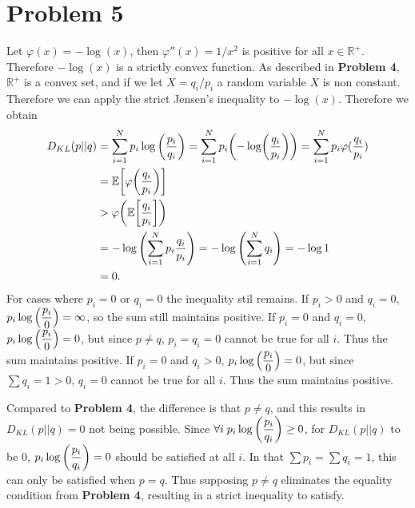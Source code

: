 \documentclass[10pt]{article}
\begin{document}
\section*{Problem 5}
Let $\varphi(x) = -\log(x)$, then $\varphi''(x) = 1/x^2$ is positive for all $x \in \mathbb{R}^+$. Therefore $-\log(x)$ is a strictly convex function.
As described in \textbf{Problem 4}, $\mathbb{R}^+$ is a convex set, and if we let $X = {q_i}/{p_i}$ a random variable $X$ is non constant.
Therefore we can apply the strict Jensen's inequality to $-\log(x)$. 
Therefore we obtain
\begin{align*}
    D_{KL}(p||q) &= \sum_{i=1}^{N}p_i\log\qty(\frac{p_i}{q_i}) = \sum_{i=1}^{N}p_i\qty(-\log(\frac{q_i}{p_i})) = \sum_{i=1}^{N}p_i\varphi(\frac{q_i}{p_i})\\
    &= \mathbb{E}\qty[\varphi\qty(\frac{q_i}{p_i})] \\
    &> \varphi\qty(\mathbb{E}\qty[\frac{q_i}{p_i}]) \\
    &= -\log\qty(\sum_{i=1}^{N}p_i\frac{q_i}{p_i}) = -\log\qty(\sum_{i=1}^{N}q_i) = -\log 1 \\
    &= 0.
\end{align*}
For cases where $p_i = 0$ or $q_i = 0$ the inequality stil remains. If $p_i > 0$ and $q_i = 0$, $p_i\log\qty(\dfrac{p_i}{0}) = \infty$, so the sum still maintains positive.
If $p_i = 0$ and $q_i = 0$,$p_i\log\qty(\dfrac{p_i}{0}) = 0$, but since $p \neq q$, $p_i = q_i = 0$ cannot be true for all $i$. Thus the sum maintains positive.
If $p_i = 0$ and $q_i > 0$, $p_i\log\qty(\dfrac{p_i}{0}) = 0$, but since $\sum{q_i} = 1 > 0$, $q_i = 0$ cannot be true for all $i$. Thus the sum maintains positive.

\vspace{3mm}
Compared to \textbf{Problem 4}, the difference is that $p \neq q$, and this results in $D_{KL}(p||q) = 0$ not being possible.
Since $\forall i \; p_i\log\qty(\dfrac{p_i}{q_i}) \geq 0$, for $D_{KL}(p||q)$ to be $0$, $p_i\log\qty(\dfrac{p_i}{q_i}) = 0$ should be satisfied at all $i$.
In that $\sum{p_i} = \sum{q_i} = 1$, this can only be satisfied when $p = q$.
Thus supposing $p \neq q$ eliminates the equality condition from \textbf{Problem 4}, resulting in a strict inequality to satisfy.
\end{document}
